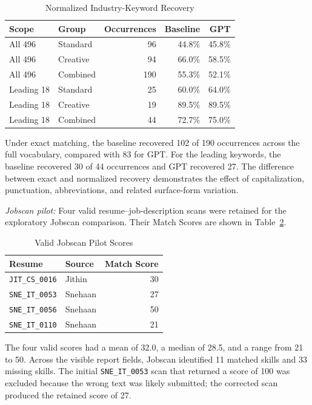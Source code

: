\documentclass[conference]{IEEEtran}
\begin{document}
\begin{table}[t]
\caption{Normalized Industry-Keyword Recovery}
\label{tab:industry_recovery}
\centering
\scriptsize
\setlength{\tabcolsep}{2.5pt}
\begin{tabular}{llrrr}
\toprule
Scope & Group & Occurrences & Baseline & GPT \\
\midrule
All 496 & Standard & 96 & 44.8\% & 45.8\% \\
All 496 & Creative & 94 & 66.0\% & 58.5\% \\
All 496 & Combined & 190 & 55.3\% & 52.1\% \\
\midrule
Leading 18 & Standard & 25 & 60.0\% & 64.0\% \\
Leading 18 & Creative & 19 & 89.5\% & 89.5\% \\
Leading 18 & Combined & 44 & 72.7\% & 75.0\% \\
\bottomrule
\end{tabular}
\end{table}

Under exact matching, the baseline recovered 102 of 190 occurrences
across the full vocabulary, compared with 83 for GPT. For the leading
keywords, the baseline recovered 30 of 44 occurrences and GPT recovered
27. The difference between exact and normalized recovery demonstrates
the effect of capitalization, punctuation, abbreviations, and related
surface-form variation.

\textit{Jobscan pilot:}
Four valid resume--job-description scans were retained for the
exploratory Jobscan comparison. Their Match Scores are shown in
Table~\ref{tab:jobscan_results}.

\begin{table}[t]
\caption{Valid Jobscan Pilot Scores}
\label{tab:jobscan_results}
\centering
\footnotesize
\begin{tabular}{llr}
\toprule
Resume & Source & Match Score \\
\midrule
\texttt{JIT\_CS\_0016} & Jithin & 30 \\
\texttt{SNE\_IT\_0053} & Snehaan & 27 \\
\texttt{SNE\_IT\_0056} & Snehaan & 50 \\
\texttt{SNE\_IT\_0110} & Snehaan & 21 \\
\bottomrule
\end{tabular}
\end{table}

The four valid scores had a mean of 32.0, a median of 28.5, and a range
from 21 to 50. Across the visible report fields, Jobscan identified 11
matched skills and 33 missing skills. The initial
\texttt{SNE\_IT\_0053} scan that returned a score of 100 was excluded
because the wrong text was likely submitted; the corrected scan produced
the retained score of 27.
\end{document}

